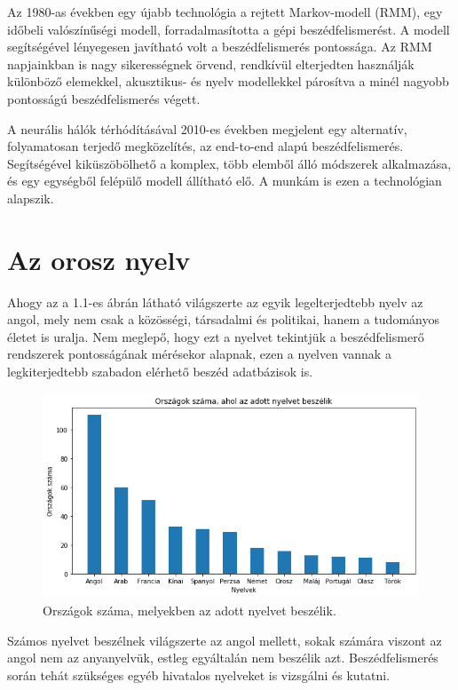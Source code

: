 Az 1980-as években egy újabb technológia a rejtett Markov-modell (RMM), egy időbeli valószínűségi modell, forradalmasította a gépi beszédfelismerést. A modell segítségével lényegesen javítható volt a beszédfelismerés pontossága. Az RMM napjainkban is nagy sikerességnek örvend, rendkívül elterjedten használják különböző elemekkel, akusztikus- és nyelv modellekkel párosítva a minél nagyobb pontosságú beszédfelismerés végett.

A neurális hálók térhódításával 2010-es években megjelent egy alternatív, folyamatosan terjedő megközelítés, az end-to-end alapú beszédfelismerés. Segítségével kiküszöbölhető a komplex, több elemből álló módszerek alkalmazása, és egy egységből felépülő modell állítható elő. A munkám is ezen a technológian alapszik.

\section{Az orosz nyelv}

Ahogy az a 1.1-es ábrán látható világszerte az egyik legelterjedtebb nyelv az angol, mely nem csak a közösségi, társadalmi és politikai, hanem a tudományos életet is uralja. Nem meglepő, hogy ezt a nyelvet tekintjük a beszédfelismerő rendszerek pontosságának mérésekor alapnak, ezen a nyelven vannak a legkiterjedtebb szabadon elérhető beszéd adatbázisok is.

\begin{figure}[!ht]
\centering
\includegraphics[width=150mm, keepaspectratio]{figures/languagesInCountries.png}
\caption{Országok száma, melyekben az adott nyelvet beszélik. \cite{nyelvekvilaga}}
\end{figure}

Számos nyelvet beszélnek világszerte az angol mellett, sokak számára viszont az angol nem az anyanyelvük, estleg egyáltalán nem beszélik azt. Beszédfelismerés során tehát szükséges egyéb hivatalos nyelveket is vizsgálni és kutatni.

